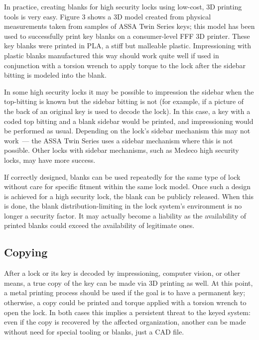 \documentclass{acm_proc_article-sp}
\begin{document}
In practice, creating blanks for high security locks using low-cost, 3D printing tools is very easy. Figure 3 shows a 3D model created from physical measurements taken from samples of ASSA Twin Series keys; this model has been used to successfully print key blanks on a consumer-level FFF 3D printer. These key blanks were printed in PLA, a stiff but malleable plastic. Impressioning with plastic blanks manufactured this way should work quite well if used in conjunction with a torsion wrench to apply torque to the lock after the sidebar bitting is modeled into the blank.

In some high security locks it may be possible to impression the sidebar when the top-bitting is known but the sidebar bitting is not (for example, if a picture of the back of an original key is used to decode the lock). In this case, a key with a coded top bitting and a blank sidebar would be printed, and impressioning would be performed as usual. Depending on the lock's sidebar mechanism this may not work~--- the ASSA Twin Series uses a sidebar mechanism where this is not possible. Other locks with sidebar mechanisms, such as Medeco high security locks, may have more success.

If correctly designed, blanks can be used repeatedly for the same type of lock without care for specific fitment within the same lock model. Once such a design is achieved for a high security lock, the blank can be publicly released. When this is done, the blank distribution-limiting in the lock system's environment is no longer a security factor. It may actually become a liability as the availability of printed blanks could exceed the availability of legitimate ones.

\subsection{Copying}
After a lock or its key is decoded by impressioning, computer vision, or other means, a true copy of the key can be made via 3D printing as well. At this point, a metal printing process should be used if the goal is to have a permanent key; otherwise, a copy could be printed and torque applied with a torsion wrench to open the lock. In both cases this implies a persistent threat to the keyed system: even if the copy is recovered by the affected organization, another can be made without need for special tooling or blanks, just a CAD file.
\end{document}
